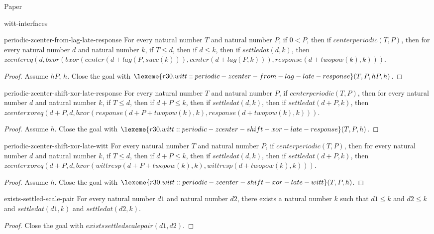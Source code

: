 \begin{lexlean}{Paper}
\begin{section}{witt-interfaces}
  \begin{theorem}{periodic-zcenter-from-lag-late-response}
  For every natural number \(T\) and natural number \(P\), if \(0 < P\), then if \(centerperiodic(T, P)\), then for every natural number \(d\) and natural number \(k\), if \(T ≤ d\), then if \(d ≤ k\), then if \(settledat(d, k)\), then \(zcentereq(d, bxor(bxor(center(d + lag(P, succ(k))), center(d + lag(P, k))), response(d + twopow(k), k)))\).
  \begin{proof}
  Assume \(hP\), \(h\).
  Close the goal with \(\lexeme{r30.witt::periodic-zcenter-from-lag-late-response}(T, P, hP, h)\).
  \end{proof}
  \end{theorem}

  \begin{theorem}{periodic-zcenter-shift-xor-late-response}
  For every natural number \(T\) and natural number \(P\), if \(centerperiodic(T, P)\), then for every natural number \(d\) and natural number \(k\), if \(T ≤ d\), then if \(d + P ≤ k\), then if \(settledat(d, k)\), then if \(settledat(d + P, k)\), then \(zcenterxoreq(d + P, d, bxor(response(d + P + twopow(k), k), response(d + twopow(k), k)))\).
  \begin{proof}
  Assume \(h\).
  Close the goal with \(\lexeme{r30.witt::periodic-zcenter-shift-xor-late-response}(T, P, h)\).
  \end{proof}
  \end{theorem}

  \begin{theorem}{periodic-zcenter-shift-xor-late-witt}
  For every natural number \(T\) and natural number \(P\), if \(centerperiodic(T, P)\), then for every natural number \(d\) and natural number \(k\), if \(T ≤ d\), then if \(d + P ≤ k\), then if \(settledat(d, k)\), then if \(settledat(d + P, k)\), then \(zcenterxoreq(d + P, d, bxor(wittresp(d + P + twopow(k), k), wittresp(d + twopow(k), k)))\).
  \begin{proof}
  Assume \(h\).
  Close the goal with \(\lexeme{r30.witt::periodic-zcenter-shift-xor-late-witt}(T, P, h)\).
  \end{proof}
  \end{theorem}

  \begin{theorem}{exists-settled-scale-pair}
  For every natural number \(d1\) and natural number \(d2\), there exists a natural number \(k\) such that \(d1 ≤ k\) and \(d2 ≤ k\) and \(settledat(d1, k)\) and \(settledat(d2, k)\).
  \begin{proof}
  Close the goal with \(existssettledscalepair(d1, d2)\).
  \end{proof}
  \end{theorem}


\end{section}
\end{lexlean}
